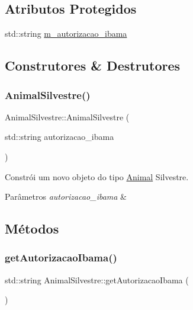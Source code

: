 \subsection*{Atributos Protegidos}
\begin{DoxyCompactItemize}
\item 
std\+::string \hyperlink{classAnimalSilvestre_a921c430fa2507062e3a2605599dd6735}{m\+\_\+autorizacao\+\_\+ibama}
\end{DoxyCompactItemize}


\subsection{Construtores \& Destrutores}
\mbox{\label{classAnimalSilvestre_aec66dbda96e9aa2bd231fd3b699c948f}} 
\subsubsection{\texorpdfstring{Animal\+Silvestre()}{AnimalSilvestre()}}
{\footnotesize\ttfamily Animal\+Silvestre\+::\+Animal\+Silvestre (\begin{DoxyParamCaption}\item[{std\+::string}]{autorizacao\+\_\+ibama }\end{DoxyParamCaption})}



Constrói um novo objeto do tipo \hyperlink{classAnimal}{Animal} Silvestre. 


\begin{DoxyParams}{Parâmetros}
{\em autorizacao\+\_\+ibama} & \\
\hline
\end{DoxyParams}


\subsection{Métodos}
\mbox{\label{classAnimalSilvestre_a040b1391d175d7572d11deddc7b3e8cb}} 
\subsubsection{\texorpdfstring{get\+Autorizacao\+Ibama()}{getAutorizacaoIbama()}}
{\footnotesize\ttfamily std\+::string Animal\+Silvestre\+::get\+Autorizacao\+Ibama (\begin{DoxyParamCaption}{ }\end{DoxyParamCaption})}



